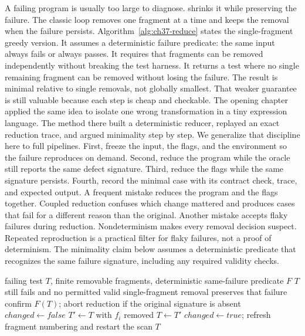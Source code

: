 A failing program is usually too large to diagnose.
 shrinks it while preserving the failure.
The classic loop removes one fragment at a time and keeps the removal when the failure persists.
Algorithm~\ref{alg:ch37-reduce} states the single-fragment greedy version.
It assumes a deterministic failure predicate: the same input always fails or always passes.
It requires that fragments can be removed independently without breaking the test harness.
It returns a test where no single remaining fragment can be removed without losing the failure.
The result is minimal relative to single removals, not globally smallest.
That weaker guarantee is still valuable because each step is cheap and checkable.
The opening chapter applied the same idea to isolate one wrong transformation in a tiny expression language.
The method there built a deterministic reducer, replayed an exact reduction trace, and argued minimality step by step.
We generalize that discipline here to full pipelines.
First, freeze the input, the flags, and the environment so the failure reproduces on demand.
Second, reduce the program while the oracle still reports the same defect signature.
Third, reduce the flags while the same signature persists.
Fourth, record the minimal case with its contract check, trace, and expected output.
A frequent mistake reduces the program and the flags together.
Coupled reduction confuses which change mattered and produces cases that fail for a different reason than the original.
Another mistake accepts flaky failures during reduction.
Nondeterminism makes every removal decision suspect.
Repeated reproduction is a practical filter for flaky failures, not a proof of determinism.
The minimality claim below assumes a deterministic predicate that recognizes the same failure signature, including any required validity checks.

\begin{algorithm}[htbp]
\caption{Greedy single-fragment test-case reduction}\label{alg:ch37-reduce}
\begin{pseudocode}
\Require failing test $T$, finite removable fragments, deterministic same-failure predicate $F$
\Ensure $T$ still fails and no permitted valid single-fragment removal preserves that failure
\State confirm $F(T)$; abort reduction if the original signature is absent
\Repeat
\State $changed \gets false$
\State $T' \gets T$ with $f_i$ removed
\State $T \gets T'$
\State $changed \gets true$; refresh fragment numbering and restart the scan
\State \Break
\EndIf
\EndFor
{}
\State \Return $T$
\end{pseudocode}
\end{algorithm}

